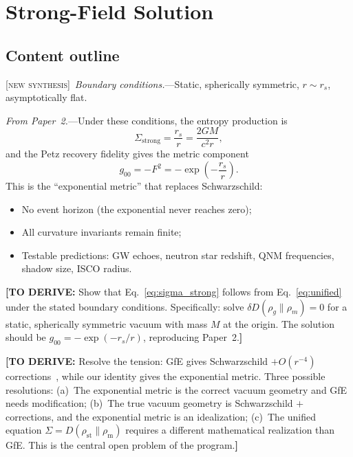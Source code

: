 \documentclass[prl,twocolumn,superscriptaddress,longbibliography,floatfix]{revtex4-2}
\newcommand{\newsyn}{\textsc{[new synthesis]}}
\newcommand{\toderive}[1]{{\color{red}\textbf{[TO DERIVE:} #1\textbf{]}}}
\begin{document}
\section{Strong-Field Solution}
\label{sec:strong_field}

\subsection*{Content outline}

\newsyn\ \emph{Boundary conditions.}---Static, spherically symmetric,
$r \sim r_s$, asymptotically flat.

\emph{From Paper~2.}---Under these conditions, the entropy production
is~\cite{Paper2}
\begin{equation}
\Sigma_{\mathrm{strong}} = \frac{r_s}{r} = \frac{2GM}{c^2 r},
\label{eq:sigma_strong}
\end{equation}
and the Petz recovery fidelity gives the metric component
\begin{equation}
g_{00} = -F^2 = -\exp\!\left(-\frac{r_s}{r}\right).
\label{eq:exp_metric}
\end{equation}
This is the ``exponential metric'' that replaces Schwarzschild:
\begin{itemize}
\item No event horizon (the exponential never reaches zero);
\item All curvature invariants remain finite;
\item Testable predictions: GW echoes, neutron star redshift,
  QNM frequencies, shadow size, ISCO radius.
\end{itemize}

\toderive{Show that Eq.~\eqref{eq:sigma_strong} follows from
Eq.~\eqref{eq:unified} under the stated boundary conditions.
Specifically: solve $\delta D(\rho_g \| \rho_m) = 0$ for a
static, spherically symmetric vacuum with mass $M$ at the origin.
The solution should be $g_{00} = -\exp(-r_s/r)$, reproducing
Paper~2.}

\toderive{Resolve the tension: GfE gives Schwarzschild $+ O(r^{-4})$
  corrections~\cite{Thattarampilly2026}, while our identity gives the
  exponential metric. Three possible resolutions:
  (a)~The exponential metric is the correct vacuum geometry and GfE
  needs modification;
  (b)~The true vacuum geometry is Schwarzschild $+$ corrections, and the
  exponential metric is an idealization;
  (c)~The unified equation $\Sigma = D(\rho_{\mathrm{st}} \| \rho_{\mathrm{m}})$
  requires a different mathematical realization than GfE.
  This is the central open problem of the program.}
\end{document}
